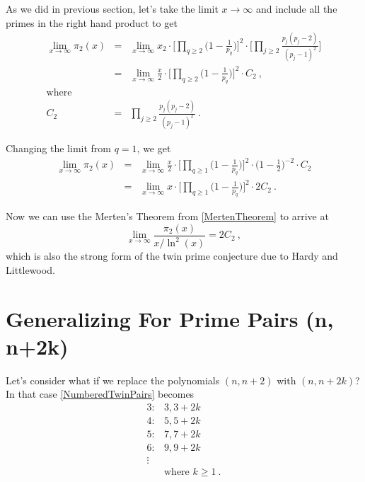 \documentclass{article}
\numberwithin{equation}{section}
\begin{document}
As we did in previous section, let's take the limit $x \to \infty$ and include all the primes in the right hand product to get
\begin{eqnarray} \label{RawTwinPrimeCountAtLimit}
\lim_{x \to \infty} \pi_2(x) &=& \lim_{x \to \infty} x_2 \cdot \Big[\prod\limits_{q \ge 2}{\Big(1 - \frac{1}{p_q} \Big)}\Big]^2 \cdot \Big[\prod\limits_{j \ge 2}{\frac{p_j (p_j - 2)}{(p_j - 1)^2}}\Big]
\nonumber\\
&=& \lim_{x \to \infty} \frac{x}{2} \cdot \Big[\prod\limits_{q \ge 2}{\Big(1 - \frac{1}{p_q} \Big)}\Big]^2 \cdot C_2 ~ ,
\nonumber\\
\textrm{where}
\nonumber\\
C_2 &=& \prod\limits_{j \ge 2}{\frac{p_j (p_j - 2)}{(p_j - 1)^2}} \nonumber ~ .
\end{eqnarray}

Changing the limit from $q=1$, we get
\begin{eqnarray} \nonumber
\lim_{x \to \infty} \pi_2(x) &=& \lim_{x \to \infty} \frac{x}{2} \cdot \Big[\prod\limits_{q \ge 1}{\Big(1 - \frac{1}{p_q} \Big)}\Big]^2 \cdot \Big(1-\frac{1}{2}\Big)^{-2} \cdot C_2
\nonumber\\
 &=& \lim_{x \to \infty} x \cdot \Big[\prod\limits_{q \ge 1}{\Big(1 - \frac{1}{p_q} \Big)}\Big]^2 \cdot 2C_2 \nonumber ~ .
\end{eqnarray}

Now we can use the Merten's Theorem from \eqref{MertenTheorem} to arrive at
\begin{equation} \label{StrongTwinPrimeTheorem}
\lim_{x \to \infty} \frac{\pi_2(x)}{x / \ln^2(x)}= 2C_2 ~ ,
\end{equation}
which is also the strong form of the twin prime conjecture due to Hardy and Littlewood.

\section{Generalizing For Prime Pairs (n, n+2k)}
Let's consider what if we replace the polynomials $(n, n + 2)$ with $(n, n + 2k)$? In that case \eqref{NumberedTwinPairs} becomes
\begin{eqnarray} \label{Numbered2kPairs}
3: & 3,3+2k \nonumber \\
4: & 5,5+2k \nonumber \\
5: & 7,7+2k \nonumber \\
6: & 9,9+2k \nonumber \\
\vdots 
\nonumber \\
& \textrm{where } k \ge 1 ~ .
\end{eqnarray}
\end{document}
